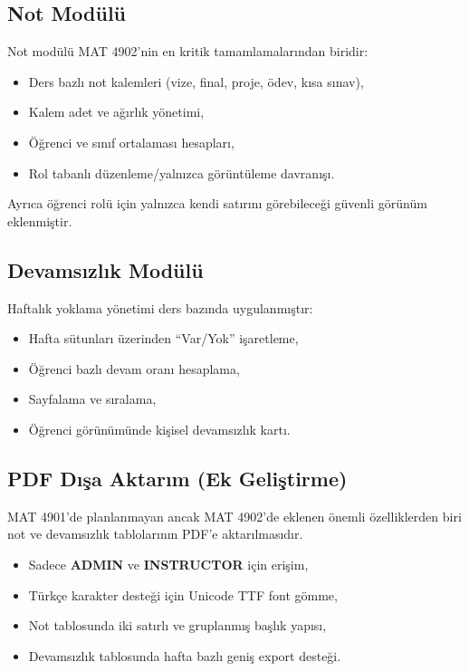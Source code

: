 \documentclass[12pt,a4paper]{article}
\begin{document}
\subsection{Not Modülü}
Not modülü MAT 4902'nin en kritik tamamlamalarından biridir:

\begin{itemize}[leftmargin=*]
    \item Ders bazlı not kalemleri (vize, final, proje, ödev, kısa sınav),
    \item Kalem adet ve ağırlık yönetimi,
    \item Öğrenci ve sınıf ortalaması hesapları,
    \item Rol tabanlı düzenleme/yalnızca görüntüleme davranışı.
\end{itemize}

Ayrıca öğrenci rolü için yalnızca kendi satırını görebileceği güvenli görünüm eklenmiştir.

\subsection{Devamsızlık Modülü}
Haftalık yoklama yönetimi ders bazında uygulanmıştır:

\begin{itemize}[leftmargin=*]
    \item Hafta sütunları üzerinden ``Var/Yok'' işaretleme,
    \item Öğrenci bazlı devam oranı hesaplama,
    \item Sayfalama ve sıralama,
    \item Öğrenci görünümünde kişisel devamsızlık kartı.
\end{itemize}

\subsection{PDF Dışa Aktarım (Ek Geliştirme)}
MAT 4901'de planlanmayan ancak MAT 4902'de eklenen önemli özelliklerden biri not ve devamsızlık tablolarının PDF'e aktarılmasıdır.

\begin{itemize}[leftmargin=*]
    \item Sadece \textbf{ADMIN} ve \textbf{INSTRUCTOR} için erişim,
    \item Türkçe karakter desteği için Unicode TTF font gömme,
    \item Not tablosunda iki satırlı ve gruplanmış başlık yapısı,
    \item Devamsızlık tablosunda hafta bazlı geniş export desteği.
\end{itemize}
\end{document}
